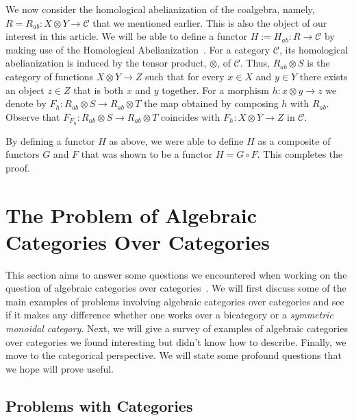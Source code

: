 \documentclass[a4paper,reqno,oneside]{article}
\begin{document}
We now consider the homological abelianization of the coalgebra, namely, $R = R_{ab} \colon X \otimes Y \to \mathcal{C}$ that we mentioned earlier. This is also the object of our interest in this article. We will be able to define a functor $H := H_{ab}: R \to \mathcal{C}$ by making use of the Homological Abelianization~\cite{Witten2021}. For a category $\mathcal{C}$, its homological abelianization is induced by the tensor product, $\otimes$, of $\mathcal{C}$. Thus, $R_{ab} \otimes S$ is the category of functions $X \otimes Y \to Z$ such that for every $x \in X$ and $y \in Y$ there exists an object $z \in Z$ that is both $x$ and $y$ together. For a morphism $h: x \otimes y \to z$ we denote by $F_h: R_{ab} \otimes S \to R_{ab} \otimes T$ the map obtained by composing $h$ with $R_{ab}$. Observe that $F_{F_h}: R_{ab} \otimes S \to R_{ab} \otimes T$ coincides with $F_{h}: X \otimes Y \to Z$ in $\mathcal{C}$.

By defining a functor $H$ as above, we were able to define $H$ as a composite of functors $G$ and $F$ that was shown to be a functor $H = G \circ F$. This completes the proof.

\section{The Problem of Algebraic Categories Over Categories}

This section aims to answer some questions we encountered when working on the question of algebraic categories over categories~\cite{Klein2007}. We will first discuss some of the main examples of problems involving algebraic categories over categories and see if it makes any difference whether one works over a bicategory or a \textit{symmetric monoidal category}. Next, we will give a survey of examples of algebraic categories over categories we found interesting but didn't know how to describe. Finally, we move to the categorical perspective. We will state some profound questions that we hope will prove useful.

\subsection*{Problems with Categories}
\end{document}
